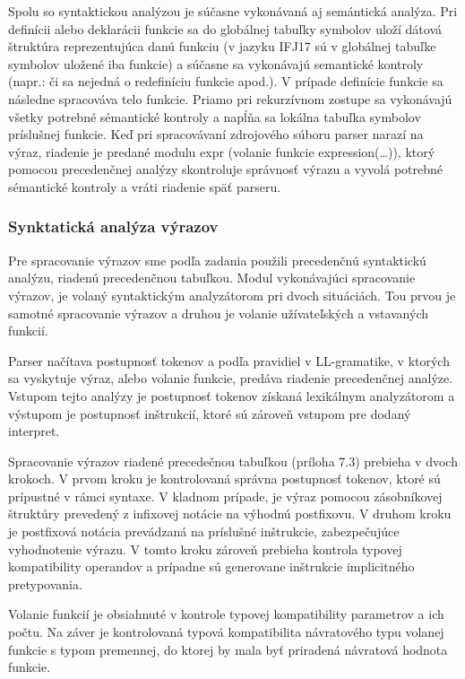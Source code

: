 \documentclass[11pt,a4paper]{article}
\begin{document}
		Spolu so syntaktickou analýzou je súčasne vykonávaná aj semántická analýza. Pri definícii alebo deklarácii funkcie sa do globálnej tabuľky 
		symbolov uloží dátová štruktúra reprezentujúca danú funkciu (v jazyku IFJ17 sú v globálnej tabuľke symbolov uložené iba funkcie) a súčasne 
		sa vykonávajú semantické kontroly (napr.: či sa nejedná o redefiníciu funkcie apod.). V prípade definície funkcie sa následne spracováva 
		telo funkcie. Priamo pri rekurzívnom zostupe sa vykonávajú všetky potrebné sémantické kontroly a napĺňa sa lokálna tabuľka symbolov príslušnej funkcie. 
		Keď pri spracovávaní zdrojového súboru parser narazí na výraz, riadenie je predané modulu expr (volanie funkcie expression(\dots)), ktorý 
		pomocou precedenčnej analýzy skontroluje správnosť výrazu a vyvolá potrebné sémantické kontroly a vráti riadenie späť parseru.

		\subsubsection{Synktatická analýza výrazov}

		Pre spracovanie výrazov sme podľa zadania použili precedenčnú syntaktickú analýzu, riadenú precedenčnou tabuľkou. Modul vykonávajúci spracovanie výrazov, je volaný syntaktickým analyzátorom pri dvoch situáciách. Tou prvou je samotné spracovanie výrazov a druhou je volanie užívateľských a vstavaných funkcií.
		
		Parser načítava postupnosť tokenov a podľa pravidiel v LL-gramatike, v ktorých sa vyskytuje výraz, alebo volanie funkcie, predáva riadenie precedenčnej analýze. Vstupom tejto analýzy je postupnosť tokenov získaná lexikálnym analyzátorom a výstupom je postupnosť inštrukcií, ktoré sú zároveň vstupom pre dodaný interpret.
		
		Spracovanie výrazov riadené precedečnou tabuľkou (príloha 7.3) prebieha v dvoch krokoch. V prvom kroku je kontrolovaná správna postupnosť tokenov, ktoré sú prípustné v rámci syntaxe. V kladnom prípade, je výraz pomocou zásobníkovej štruktúry prevedený z infixovej notácie na výhodnú postfixovu. V druhom kroku je postfixová notácia prevádzaná na príslušné inštrukcie, zabezpečujúce vyhodnotenie výrazu. V tomto kroku zároveň prebieha kontrola typovej kompatibility operandov a prípadne sú generovane inštrukcie implicitného pretypovania.
		
		Volanie funkcií je obsiahnuté v kontrole typovej kompatibility parametrov a ich počtu. Na záver je kontrolovaná typová kompatibilita návratového typu volanej funkcie s typom premennej, do ktorej by mala byť priradená návratová hodnota funkcie.
\end{document}
